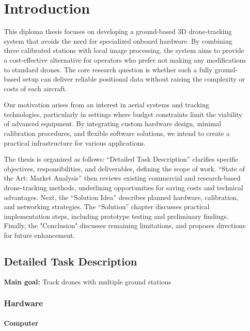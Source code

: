 \chapter{Introduction}

This diploma thesis focuses on developing a ground-based 3D drone-tracking system that avoids the need for specialized onboard hardware. By combining three calibrated stations with local image processing, the system aims to provide a cost-effective alternative for operators who prefer not making any modifications to standard drones. The core research question is whether such a fully ground-based setup can deliver reliable positional data without raising the complexity or costs of each aircraft.

Our motivation arises from an interest in aerial systems and tracking technologies, particularly in settings where budget constraints limit the viability of advanced equipment. By integrating custom hardware design, minimal calibration procedures, and flexible software solutions, we intend to create a practical infrastructure for various applications.

The thesis is organized as follows: “Detailed Task Description” clarifies specific objectives, responsibilities, and deliverables, defining the scope of work. “State of the Art: Market Analysis” then reviews existing commercial and research-based drone-tracking methods, underlining opportunities for saving costs and technical advantages. Next, the “Solution Idea” describes planned hardware, calibration, and networking strategies. The “Solution” chapter discusses practical implementation steps, including prototype testing and preliminary findings. Finally, the "Conclusion" discusses remaining limitations, and proposes directions for future enhancement.

\section{Detailed Task Description}

\textbf{Main goal:} Track drones with multiple ground stations

\subsection{Hardware}

\subsubsection{Computer}

